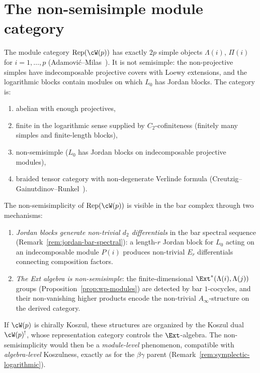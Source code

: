 
\section{The non-semisimple module category}
\label{sec:wp-modules}

\begin{proposition}\label{prop:wp-modules}
The module category $\operatorname{Rep}(\cW(p))$ has exactly
$2p$ simple objects $\Lambda(i)$, $\Pi(i)$ for
$i = 1, \ldots, p$ (Adamovi\'c--Milas~\cite{AdamovicMilas2008}).
It is not semisimple: the non-projective simples have
indecomposable projective covers with Loewy extensions, and the
logarithmic blocks contain modules on which $L_0$ has Jordan
blocks. The category is:
\begin{enumerate}
\item abelian with enough projectives,
\item finite in the logarithmic sense supplied by
$C_2$-cofiniteness (finitely many simples and finite-length
blocks),
\item non-semisimple ($L_0$ has Jordan blocks on indecomposable
projective modules),
\item braided tensor category with non-degenerate Verlinde
formula (Creutzig--Gainutdinov--Runkel~\cite{CreutzigGainutdinovRunkel20}).
\end{enumerate}
\end{proposition}

\begin{remark}
\label{rem:wp-bar-nonsemisimple}
The non-semisimplicity of $\operatorname{Rep}(\cW(p))$ is
visible in the bar complex through two mechanisms:
\begin{enumerate}
\item \emph{Jordan blocks generate non-trivial $d_2$
differentials} in the bar spectral sequence
(Remark~\ref{rem:jordan-bar-spectral}): a length-$r$
Jordan block for $L_0$ acting on an indecomposable module
$P(i)$ produces non-trivial $E_r$ differentials connecting
composition factors.
\item \emph{The Ext algebra is non-semisimple}: the
finite-dimensional $\Ext^*(\Lambda(i), \Lambda(j))$ groups
(Proposition~\ref{prop:wp-modules}) are detected by bar
$1$-cocycles, and their non-vanishing higher products encode
the non-trivial $A_\infty$-structure on the derived category.
\end{enumerate}
If $\cW(p)$ is chirally Koszul, these structures are organized
by the Koszul dual $\cW(p)^!$, whose representation category
controls the $\Ext$-algebra. The non-semisimplicity would then
be a \emph{module-level} phenomenon, compatible with
\emph{algebra-level} Koszulness, exactly as for the $\beta\gamma$
parent (Remark~\ref{rem:symplectic-logarithmic}).
\end{remark}


